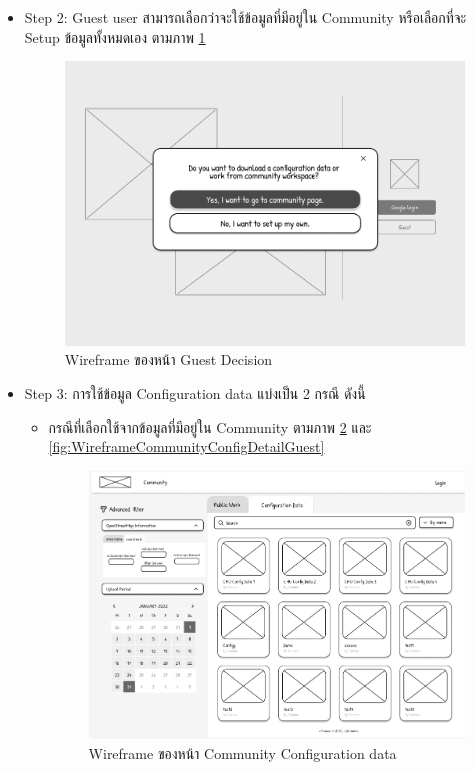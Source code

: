 \begin{mypara}
\begin{itemize}
    \item Step 2: Guest user สามารถเลือกว่าจะใช้ข้อมูลที่มีอยู่ใน Community หรือเลือกที่จะ Setup ข้อมูลทั้งหมดเอง
    ตามภาพ \ref{fig:WireframeGuestDecision}
      \begin{figure}[H]
        \centering
        \includegraphics[scale=0.35]
        {guest_login.png}
        \caption{Wireframe ของหน้า Guest Decision}
        \label{fig:WireframeGuestDecision}
      \end{figure}

    \item Step 3: การใช้ข้อมูล Configuration data แบ่งเป็น 2 กรณี ดังนี้
    \begin{itemize}
        \item กรณีที่เลือกใช้จากข้อมูลที่มีอยู่ใน Community 
        ตามภาพ \ref{fig:WireframeCommunityConfigGuest} และ \ref{fig:WireframeCommunityConfigDetailGuest}
          \begin{figure}[H]
            \centering
            \includegraphics[scale=0.4]{conf_commu_guest.png}
            \caption{Wireframe ของหน้า Community Configuration data}
            \label{fig:WireframeCommunityConfigGuest}
          \end{figure}


\end{itemize}
\end{itemize}
\end{mypara}
